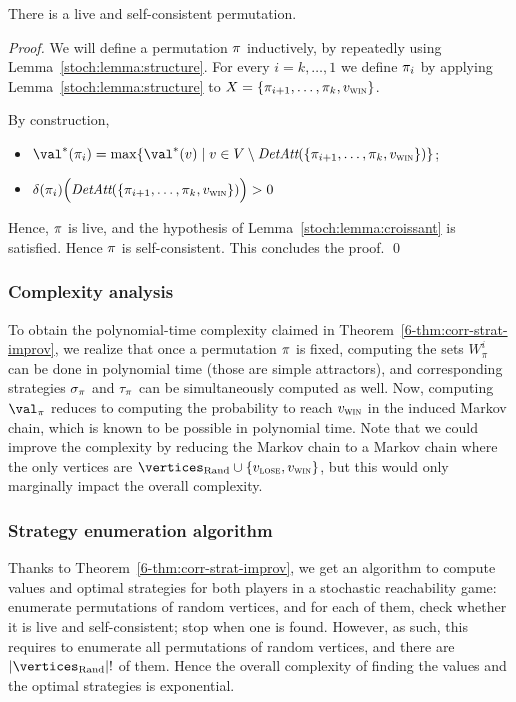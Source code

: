\begin{lemma}
  \label{stoch:lemma-existence}
  There is a live and self-consistent permutation.
\end{lemma}

\begin{proof}
  We will define a permutation $\pi$ inductively, by repeatedly
  using Lemma~\ref{stoch:lemma:structure}.  For every $i =k, \ldots
  ,1$ we define $\pi_i$ by applying
  Lemma~\ref{stoch:lemma:structure} to $X =
  \{\pi_{i+1},\ldots,\pi_k,v_{\textsc{win}}\}$.

  By construction,
  \begin{itemize}
  \item $\val^*(\perm_i) = \max \{\val^*(v) \mid v \in V \setminus
    \DetAtt(\{\perm_{i+1},\ldots,\perm_k,\vwin\})\}$;
  \item
    $\delta(\pi_i)\Big(\textit{DetAtt}(\{\pi_{i+1},\ldots,\pi_k,v_{\textsc{win}}\})\Big)
    >0$
  \end{itemize}
  Hence, $\pi$ is live, and the hypothesis of
  Lemma~\ref{stoch:lemma:croissant} is satisfied. Hence $\pi$ is
  self-consistent. This concludes the proof. \qed
\end{proof}

\subsubsection{Complexity analysis}

To obtain the polynomial-time complexity claimed in
Theorem~\ref{6-thm:corr-strat-improv}, we realize that once a
permutation $\pi$ is fixed, computing the sets $W_\pi^i$ can be done
in polynomial time (those are simple attractors), and corresponding
strategies $\sigma_\pi$ and $\tau_\pi$ can be simultaneously
computed as well. Now, computing $\val_\perm$ reduces to computing the
probability to reach $v_{\textsc{win}}$ in the induced Markov chain, which is
known to be possible in polynomial time. Note that we could improve
the complexity by reducing the Markov chain to a Markov chain where
the only vertices are $\Randomvertices \cup \{\vlose,\vwin\}$, but
this would only marginally impact the overall complexity.

\subsubsection{Strategy enumeration algorithm}
\label{6-subsubsec:last}

Thanks to Theorem~\ref{6-thm:corr-strat-improv}, we get an algorithm
to compute values and optimal strategies for both players in a
stochastic reachability game: enumerate permutations of random
vertices, and for each of them, check whether it is live and
self-consistent; stop when one is found.
%
However, as such, this requires to enumerate all permutations of
random vertices, and there are $|\Randomvertices|!$ of them. Hence the
overall complexity of finding the values and the optimal strategies is
exponential.



